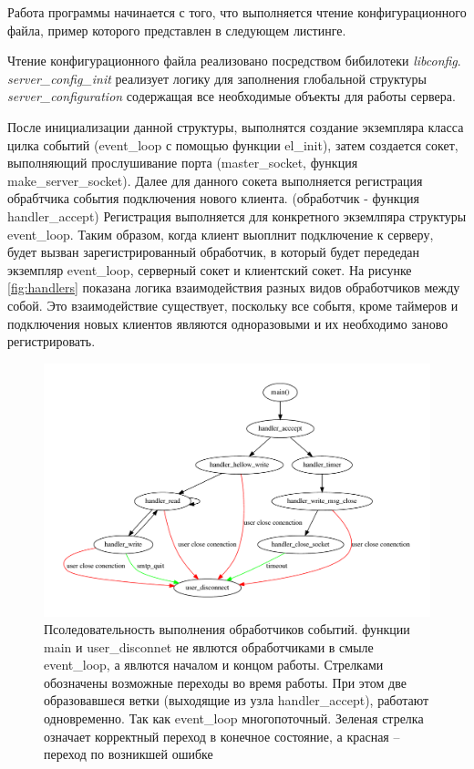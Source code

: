 \documentclass[a4paper,12pt]{report}
\begin{document}
	
	Работа программы начинается с того, что выполняется чтение конфигурационного файла, пример которого представлен в следующем листинге. 


	Чтение конфигурационного файла реализовано посредством бибилотеки \textit{libconfig}. \textit{server\_config\_init} реализует логику для заполнения глобальной структуры \textit{server\_configuration} содержащая все необходимые объекты для работы сервера. 

	 После инициализации данной структуры, выполнятся создание экземпляра класса цилка событий (event_loop с помощью функции el\_init), затем создается сокет, выполняющий прослушивание порта (master_socket, функция make\_server\_socket). Далее для данного сокета выполняется регистрация обрабтчика события подключения нового клиента. (обработчик - функция handler\_accept) Регистрация выполняется для конкретного экземлпяра структуры event\_loop. Таким образом, когда клиент выоплнит подключение к серверу, будет вызван зарегистрированный обработчик, в который будет передедан экземпляр event_loop, серверный сокет и клиентский сокет. На рисунке \ref{fig:handlers} показана логика взаимодействия разных видов обработчиков между собой. Это взаимодействие существует, поскольку все событя, кроме таймеров и подключения новых клиентов являются одноразовыми и их необходимо заново регистрировать.

	 	\begin{figure}[H]
		\centering
		\includegraphics[width=\textwidth]{./resource/handlers.pdf}
		\caption{Псоледовательность выполнения обработчиков событий. функции main и user\_disconnet не явлются обработчиками в смыле event\_loop, а явлются началом и концом работы.  Стрелками обозначены возможные переходы во время работы. При этом две образовавшеся ветки (выходящие из узла handler\_accept), работают одновременно. Так как event\_loop многопоточный. Зеленая стрелка означает корректный переход в конечное состояние, а красная -- переход по возникшей ошибке} \label{fig:ProgLogic}
	\end{figure}
\end{document}
